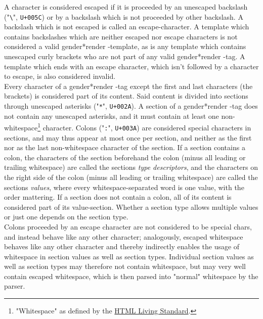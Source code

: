 \documentclass{article}
\newcommand{\GenderRender}{
    gender*render
}
\begin{document}
    A character is considered escaped if it is proceeded by an unescaped backslash ("\texttt{\textbackslash}", \texttt{U+005C}) or by a backslash which is not proceeded by other backslash.
    A backslash which is not escaped is called an escape-character.
    A template which contains backslashes which are neither escaped nor escape characters is not considered a valid \GenderRender-template, as is any template which contains unescaped curly brackets who are not part of any valid \GenderRender-tag.
    A template which ends with an escape character, which isn't followed by a character to escape, is also considered invalid.\\

    Every character of a \GenderRender-tag except the first and last characters (the brackets) is considered part of its content.
    Said content is divided into sections through unescaped asterisks ("\texttt{*}", \texttt{U+002A}).
    A section of a \GenderRender-tag does not contain any unescaped asterisks, and it must contain at least one non-whitespace\footnote{"Whitespace" as defined by the \href{https://infra.spec.whatwg.org/\#ascii-whitespace}{HTML Living Standard}.} character.
    Colons ("\texttt{:}", \texttt{U+003A}) are considered special characters in sections, and may thus appear at most once per section, and neither as the first nor as the last non-whitespace  character of the section.
    If a section contains a colon, the characters of the section beforehand the colon (minus all leading or trailing whitespace) are called the sections \emph{type descriptors}, and the characters on the right side of the colon (minus all leading or trailing whitespace) are called the sections \emph{values},
    where every whitespace-separated word is one value, with the order mattering.
    If a section does not contain a colon, all of its content is considered part of its value-section.
    Whether a section type allows multiple values or just one depends on the section type.\\

    Colons proceeded by an escape character are not considered to be special chars, and instead behave like any other character;
    analogously, escaped whitespace behaves like any other character and thereby indirectly enables the usage of whitespace in section values as well as section types.
    Individual section values as well as section types may therefore not contain whitespace, but may very well contain escaped whitespace, which is then parsed into "normal" whitespace by the parser.\\
\end{document}
